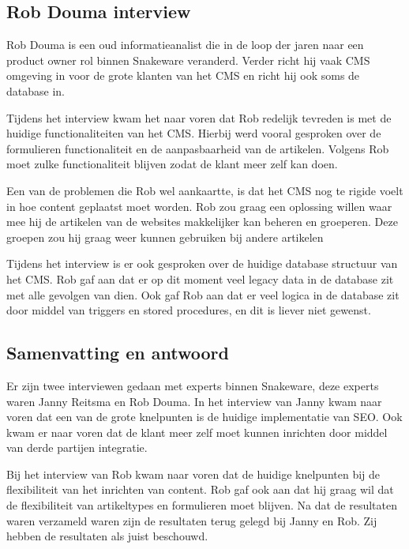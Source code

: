\subsection{Rob Douma interview}
\label{sec:RobInterview}
Rob Douma is een oud informatieanalist die in de loop der jaren naar een product owner rol binnen Snakeware veranderd.
Verder richt hij vaak CMS omgeving in voor de grote klanten van het CMS en richt hij ook soms de database in.

Tijdens het interview kwam het naar voren dat Rob redelijk tevreden is met de huidige functionaliteiten van het CMS. 
Hierbij werd vooral gesproken over de formulieren functionaliteit en de aanpasbaarheid van de artikelen.
Volgens Rob moet zulke functionaliteit blijven zodat de klant meer zelf kan doen.

\whitespace
Een van de problemen die Rob wel aankaartte, is dat het CMS nog te rigide voelt in hoe content geplaatst moet worden.
Rob zou graag een oplossing willen waar mee hij  de artikelen van de websites makkelijker kan beheren en groeperen.
Deze groepen zou hij graag weer kunnen gebruiken bij andere artikelen

%
\newpage
\whitespace
Tijdens het interview is er ook gesproken over de huidige database structuur van het CMS.
Rob gaf aan dat er op dit moment veel legacy data in de database zit met alle gevolgen van dien.
Ook gaf Rob aan dat er veel logica in de database zit door middel van triggers en stored procedures, en dit is liever niet gewenst.

\subsection{Samenvatting en antwoord}
Er zijn twee interviewen gedaan met experts binnen Snakeware, deze experts waren Janny Reitsma en Rob Douma.
In het interview van Janny kwam naar voren dat een van de grote knelpunten is de huidige implementatie van \gls{SEO}.
Ook kwam er naar voren dat de klant meer zelf moet kunnen inrichten door middel van derde partijen integratie.

\whitespace
Bij het interview van Rob kwam naar voren dat de huidige knelpunten bij de flexibiliteit van het inrichten van content.
Rob gaf ook aan dat hij graag wil dat de flexibiliteit van artikeltypes en formulieren moet blijven.
Na dat de resultaten waren verzameld waren zijn de resultaten terug gelegd bij Janny en Rob.
Zij hebben de resultaten als juist beschouwd.
